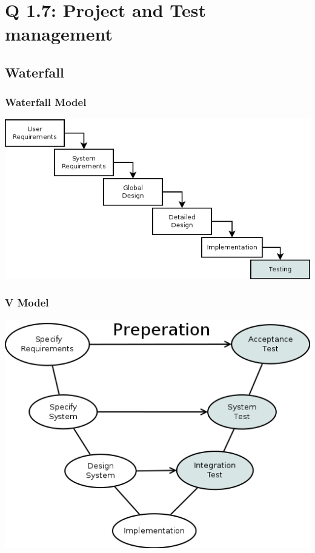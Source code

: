 
\section{Q 1.7: Project and Test management}

\subsection{Waterfall}
\begin{frame}
    \frametitle{Waterfall Model}
    \centering
    \includegraphics[scale=0.4]{waterfall.png}
\end{frame}

\begin{frame}
    \frametitle{V Model}
    \centering
    \includegraphics[scale=0.4]{v_model.png}
\end{frame}

